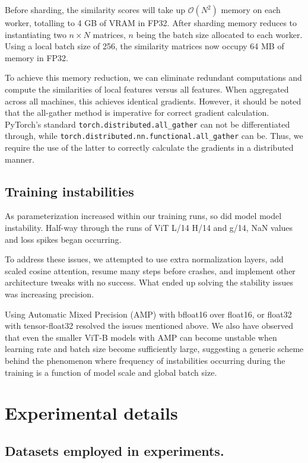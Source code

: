 \begin{appendix}
Before sharding, the similarity scores will take up $\mathcal{O}(N^2)$ memory on each worker, totalling to 4 GB of VRAM in FP32. After sharding memory reduces to instantiating two $n\times N$ matrices, $n$ being the batch size allocated to each worker. Using a local batch size of 256, the similarity matrices now occupy 64 MB of memory in FP32.

To achieve this memory reduction, we can eliminate redundant computations and compute the similarities of local features versus all features. When aggregated across all machines, this achieves identical gradients. However, it should be noted that the all-gather method is imperative for correct gradient calculation. PyTorch's standard \texttt{torch.distributed.all\_gather} can not be differentiated through, while \texttt{torch.distributed.nn.functional.all\_gather} can be. Thus, we require the use of the latter to correctly calculate the gradients in a distributed manner.


\subsection{Training instabilities}

As parameterization increased within our training runs, so did model model instability. Half-way through the runs of ViT L/14 H/14 and g/14, NaN values and loss spikes began occurring.

To address these issues, we attempted to use extra normalization layers, add scaled cosine attention, resume many steps before crashes, and implement other architecture tweaks with no success. What ended up solving the stability issues was increasing precision.

Using Automatic Mixed Precision (AMP) with bfloat16 over float16, or float32 with tensor-float32 resolved the issues mentioned above. We also have observed that even the smaller ViT-B models with AMP can become unstable when learning rate and batch size become sufficiently large, suggesting a generic scheme behind the phenomenon where frequency of instabilities occurring during the training is a function of model scale and global batch size.

\section{Experimental details}
\label{sec:appendix:experiments}

\subsection{Datasets employed in experiments.}
\label{sec:appendix:datasets}


\end{appendix}
